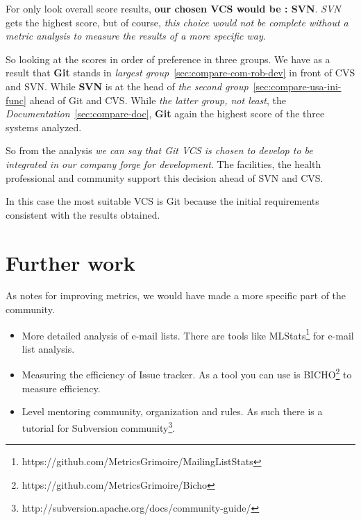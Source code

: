 \documentclass[11pt]{scrartcl}
\begin{document}
\par For only look overall score results, \textbf{our chosen VCS would be : SVN}. \emph{SVN} gets the highest score, but of course, \emph{this choice would not be complete without a metric analysis to measure the results of a more specific way}.

\par So looking at the scores in order of preference in three groups. We have as a result that \textbf{Git} stands in \emph{largest group}~\ref{sec:compare-com-rob-dev} in front of CVS and SVN. While \textbf{SVN} is at the head of \emph{the second group}~\ref{sec:compare-usa-ini-func} ahead of Git and CVS. While \emph{the latter group, not least}, the \emph{Documentation}~\ref{sec:compare-doc}, \textbf{Git} again the highest score of the three systems analyzed.

\par So from the analysis \emph{we can say that \emph{Git} VCS is chosen to develop to be integrated in our company forge for development}. The facilities, the health professional and community support this decision ahead of SVN and CVS.

\par In this case the most suitable VCS is Git because the initial requirements consistent with the results obtained.

\section{Further work}

\par As notes for improving metrics, we would have made a more specific part of the community.

\begin{itemize}

    \item More detailed analysis of e-mail lists. There are tools like MLStats\footnote{https://github.com/MetricsGrimoire/MailingListStats} for e-mail list analysis.

    \item Measuring the efficiency of Issue tracker. As a tool you can use is BICHO\footnote{https://github.com/MetricsGrimoire/Bicho} to measure efficiency.

    \item Level mentoring community, organization and rules. As such there is a tutorial for Subversion community\footnote{http://subversion.apache.org/docs/community-guide/}.

\end{itemize}
\end{document}

